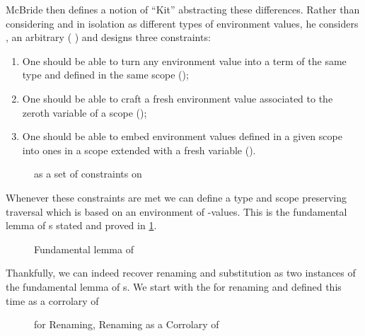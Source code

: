 McBride then defines a notion of ``Kit'' abstracting these differences.
Rather than considering  and  in isolation as different
types of environment values, he considers , an arbitrary
( ) and designs three constraints:

\begin{enumerate}
  \item
    One should be able to turn any environment value into a term of
    the same type and defined in the same scope ();
  \item
    One should be able to craft a fresh environment value associated
    to the zeroth variable of a scope ();
  \item
    One should be able to embed environment values defined in a given
    scope into ones in a scope extended with a fresh variable ().
\end{enumerate}

\begin{figure}[h]
\caption{ as a set of constraints on }
\end{figure}

Whenever these constraints are met we can define a type and scope preserving
traversal which is based on an environment of -values. This is the
fundamental lemma of s stated and proved in \cref{fig:kitlemma}.

\begin{figure}[h]
\caption{Fundamental lemma of \label{fig:kitlemma}}
\end{figure}

Thankfully, we can indeed recover renaming and substitution as two instances of
the fundamental lemma of s. We start with the  for renaming
and  defined this time as a corrolary of 

\begin{figure}[h]
\begin{minipage}{0.4\textwidth}
\end{minipage}
\begin{minipage}{0.6\textwidth}
\end{minipage}
\caption{ for Renaming, Renaming as a Corrolary of \label{fig:renkit}}
\end{figure}

